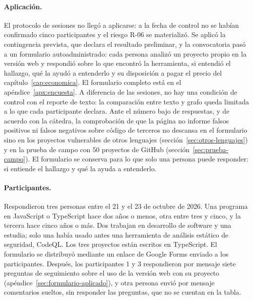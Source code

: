 \paragraph{Aplicación.} El protocolo de sesiones no llegó a
aplicarse: a la fecha de control no se habían confirmado cinco
participantes y el riesgo R-06 se materializó. Se aplicó la contingencia
prevista, que declara el resultado preliminar, y la convocatoria pasó a
un formulario autoadministrado: cada persona analizó un proyecto propio
en la versión web y respondió sobre lo que encontró la herramienta, si
entendió el hallazgo, qué la ayudó a entenderlo y su disposición a pagar
el precio del capítulo~\ref{cap:economica}. El formulario completo está
en el apéndice~\ref{apx:encuesta}. A diferencia de las sesiones, no hay
una condición de control con el reporte de texto: la comparación entre
texto y grafo queda limitada a lo que cada participante declara.
Ante el número bajo de respuestas, y de acuerdo con la cátedra, la
comprobación de que la página no informe falsos positivos ni falsos
negativos sobre código de terceros no descansa en el formulario sino en
los proyectos vulnerables de otros lenguajes
(sección~\ref{sec:otros-lenguajes}) y en la prueba de campo con 50
proyectos de GitHub (sección~\ref{sec:prueba-campo}). El formulario se
conserva para lo que solo una persona puede responder: si entiende el
hallazgo y qué la ayuda a entenderlo.

\paragraph{Participantes.} Respondieron tres personas entre el 21 y el
23 de octubre de 2026. Una programa en JavaScript o TypeScript hace dos
años o menos, otra entre tres y cinco, y la tercera hace cinco años o
más. Dos trabajan en desarrollo de software y una estudia; solo una
había usado antes una herramienta de análisis estático de seguridad,
CodeQL. Los tres proyectos están escritos en TypeScript. El formulario
se distribuyó mediante un enlace de Google Forms enviado a los
participantes. Después, los participantes 1 y 3 respondieron por mensaje
siete preguntas de seguimiento sobre el uso de la versión web con su
proyecto (apéndice~\ref{sec:formulario-aplicado}), y otra persona envió
por mensaje comentarios sueltos, sin responder las preguntas, que no se
cuentan en la tabla.

